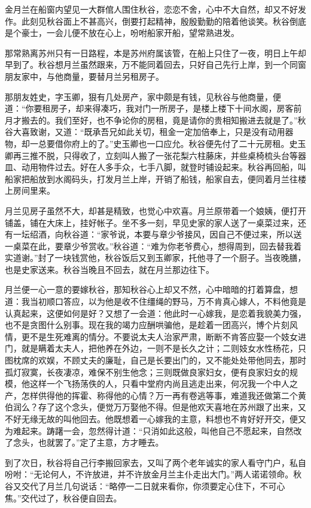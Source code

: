 \documentclass[12pt,UTF8]{ctexbook}
\begin{document}
{{{金月兰在船窗内望见一大群倌人围住秋谷，恋恋不舍，心中不大自然，却又不好发作。此刻见秋谷面上不甚高兴，倒要打起精神，殷殷勤勤的陪着他谈笑。秋谷倒底是个豪士，一会儿便不放在心上，吩咐船家开船，望常熟进发。

那常熟离苏州只有一日路程，本是苏州府属该管，在船上只住了一夜，明日上午却早到了。秋谷想月兰虽然跟来，万不能同着回去，只好自己先行上岸，到一个同窗朋友家中，与他商量，要替月兰另租房子。

那朋友姓史，字玉卿，狠有几处房产，家中颇是有钱，见秋谷与他商量，便道：“你要租房子，却来得凑巧，我对门一所房子，是楼上楼下十间水阁，房客前月才搬去的。我们至好，也不争论你的房租，竟是请你的贵相知搬进去就是了。”秋谷大喜致谢，又道：“既承吾兄如此关切，租金一定加倍奉上，只是没有动用器物，却一总要借你府上的了。”史玉卿也一口应允。秋谷便先付了二十元房租。史玉卿再三推不脱，只得收了，立刻叫人搬了一张花梨六柱藤床，并些桌椅梳头台等器皿、动用物件过去。好在人多手众，七手八脚，就登时铺设起来。秋谷再回船，叫船家把船放到水阁码头，打发月兰上岸，开销了船钱，船家自去，便同着月兰往楼上房间里来。

月兰见房子虽然不大，却甚是精致，也觉心中欢喜。月兰原带着一个娘姨，便打开铺盖，铺在大床上，挂好帐子。坐不多一刻，早见史家的家人送了一桌菜过来，还有一坛绍酒，向秋谷道：“家爷说，本要与章少爷接风，因自己不便过来，所以送一桌菜在此，要章少爷赏收。”秋谷道：“难为你老爷费心，想得周到，回去替我着实道谢。”封了一块钱赏他，秋谷饭后又到玉卿家，托他寻了一个厨子。当夜晚膳，也是史家送来。秋谷当晚且不回去，就在月兰那边往下。

月兰便一心一意的要嫁秋谷，那知秋谷心上却又不然，心中暗暗的打着算盘，想道：我当初顺口答应，以为他是收不住缰绳的野马，万不肯真心嫁人，不料他竟是认真起来，这便如何是好？又想了一会道：他此时一心嫁我，是恋着我貌美力强，也不是贪图什么别事。现在我的竭力应酬哄骗他，是趁着一团高兴，博个片刻风情，更不是生死难离的情分。不要说太夫人治家严肃，断断不肯答应娶一个妓女进门，就是瞒着太夫人，把他养在外边，一则不是长久之计；二则妓女水性杨花，只图枕席的欢娱，不顾丈夫的廉耻，自己是长要出门的，又不能处处带他同去，那时孤灯寂寞，长夜凄凉，难保不别生他念；三则既做良家妇女，便有良家妇女的规模，他这样一个飞扬荡佚的人，只看中堂府内尚且逃走出来，何况我一个中人之产，怎样供得他的挥霍、称得他的心情？万一再有卷逃等事，难道我还做第二个黄伯润么？存了这个念头，便觉万万娶他不得。但是他欢天喜地在苏州跟了出来，又不好无缘无故的叫他回去。他既想着一心嫁我的主意，料想也不肯好好开交，便又为难起来。踌躇一会，忽然得计道：“只消如此这般，叫他自己不愿起来，自然改了念头，也就罢了。”定了主意，方才睡去。

到了次日，秋谷将自己行李搬回家去，又叫了两个老年诚实的家人看守门户，私自吩咐：“无论何人，不许放进，并不许放金月兰主仆走出大门。”两人诺诺领命。秋谷又交代了月兰几句说话：“略停一二日就来看你，你须要定心住下，不可心焦。”交代过了，秋谷便自回去。

}}}
\end{document}
